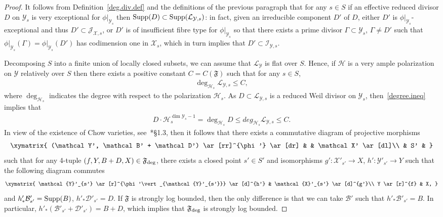 \documentclass[11pt]{ip-journal}
\theoremstyle{definition}
\newcommand{\supp}{{\rm Supp}}
\newcommand{\mys}{\mathcal{Y}_s}
\newcommand{\mcy}{\mathcal{Y}}
\begin{document}
\begin{proof}
It follows from Definition~\ref{deg.div.def} and the definitions of the previous paragraph that for any 
$s \in S$ 
if an effective reduced divisor 
$D$ 
on 
$\mathcal{Y}_s$ 
is very exceptional for 
$\phi\vert_{\mys}$ 
then 
$\supp(D) \subset \supp(\mathcal{L}_{\mcy, s})$:
in fact, 
given an irreducible component 
$D'$ 
of 
$D$,
either
$D'$
is  
$\phi\vert_{\mys}$-exceptional
and thus
$D' \subset \mathcal J_{\mathcal X, s}$, 
or 
$D'$
is of insufficient fibre type for 
$\phi\vert_{\mys}$
so that there exists a prime divisor 
$\Gamma \subset \mathcal Y_s$,
$\Gamma \neq D'$ 
such that
$\phi\vert_{\mys}(\Gamma) = \phi\vert_{\mys}(D')$
has codimension one in 
$\mathcal X_s$,
which in turn implies that 
$D' \subset \mathcal I_{\mathcal Y,s}$.
 
Decomposing 
$S$ 
into a finite union of locally closed subsets, we can assume that 
$\mathcal{L}_\mathcal{Y}$ 
is flat over 
$S$. 
Hence, if 
$\mathcal H$ 
is a very ample polarization on 
$\mathcal Y$ 
relatively over 
$S$ 
then there exists a positive constant 
$C=C(\mathfrak F)$ 
such that for any 
$s \in S$,
\begin{align}
\label{degree.ineq}
\deg_{\mathcal{H}_s} \mathcal{L}_{\mathcal Y, s} \leq C,
\end{align} 
where 
$\deg_{\mathcal{H}_s}$ 
indicates the degree with respect to the polarization 
$\mathcal{H}_s$.
As 
$D \subset \mathcal{L}_{\mathcal Y, s}$ 
is a reduced Weil divisor on 
$\mathcal{Y}_s$, 
then~\eqref{degree.ineq} implies that
\begin{align*}
D \cdot \mathcal{H}_s^{\dim \mathcal{Y}_s-1}
= \deg_{\mathcal{H}_s} D \leq deg_{\mathcal{H}_s} \mathcal{L}_{\mathcal Y, s} 
\leq C.
\end{align*}
In view of the existence of Chow varieties, see~\cite{MR1440180}*{\S 1.3}, then it follows that there exists a commutative diagram of projective morphisms 
\begin{align}
\label{fam.morf.deg.eqn}
\xymatrix{
(\mathcal Y', \mathcal B' + \mathcal D') \ar[rr]^{\phi'} \ar[dr] & 
&
\mathcal X' \ar[dl]\\
 & S' &
}
\end{align}
such that for any 4-tuple 
$(f, Y, B+D, X)\in \mathfrak{F}_{\rm deg}$, 
there exists a closed point 
$s' \in S'$ 
and isomorphisms 
$g' \colon \mathcal{X}'_{s'} \to X$, 
$h' \colon \mathcal{Y}'_{s'} \to Y$ 
such that the following diagram commutes
\begin{align*}
\xymatrix{
\mathcal{Y}'_{s'} 
\ar[r]^{\phi'\vert_{\mathcal{Y}'_{s'}}} 
\ar[d]^{h'} & 
\mathcal{X}'_{s'} 
\ar[d]^{g'}\\
Y  \ar[r]^{f} &
X,
}
\end{align*}
and 
$h'_\ast\mathcal{B}'_{s'} = \supp(B)$, 
$h'_\ast\mathcal{D}'_{s'} = D$.
If $\mathfrak{F}$ is strongly log bounded, then the only difference is that we can take $\mathcal{B}'$ such that 
$h'_\ast \mathcal{B}'_{s'}=B$.
In particular, 
$h'_\ast(\mathcal{B}'_{s'} + \mathcal{D}'_{s'}) = B+D$, 
which implies that 
$\mathfrak{F}_{\rm deg}$ 
is strongly log bounded.
\end{proof}
\end{document}
